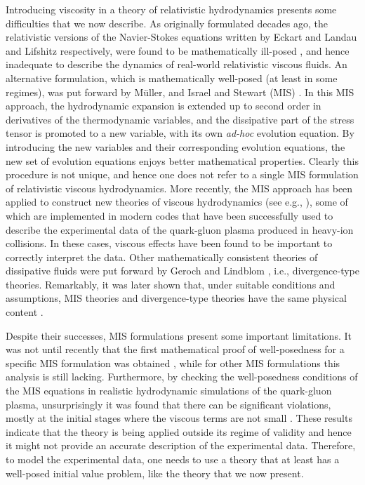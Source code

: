 \documentclass[prd,aps,twocolumn,floats,floatfix,nofootinbib,superscriptaddress] {revtex4-1}
\begin{document}
Introducing viscosity in a theory of relativistic hydrodynamics  presents some difficulties that we now describe. As originally formulated decades ago, the relativistic versions of the Navier-Stokes equations written by Eckart \cite{Eckart:1940te} and Landau and Lifshitz \cite{LandauBook} respectively, were found to be mathematically ill-posed \cite{Hiscock:1985zz}, and hence inadequate to describe the dynamics of real-world relativistic viscous fluids. 
%
An alternative formulation, which is mathematically well-posed (at least in some regimes),  was put forward by Müller, and Israel and Stewart  (MIS) \cite{Muller:1967zza,Israel:1976tn,Israel:1979wp}. In this MIS approach, the hydrodynamic expansion is extended up to second order in derivatives of the thermodynamic variables, and the dissipative part of the stress tensor is promoted to a new variable, with its own  \textit{ad-hoc} evolution equation. By introducing the new variables and their corresponding evolution equations, the new set of evolution equations enjoys better mathematical  properties. 
%
Clearly this procedure is not unique, and hence one does not refer to a single MIS formulation of relativistic viscous hydrodynamics.
%
More recently, the MIS approach has been applied to construct new theories of viscous hydrodynamics (see e.g., \cite{Baier:2007ix,Denicol:2012cn}), some of which are implemented in modern codes that have been successfully used to describe the experimental data of the quark-gluon plasma produced in heavy-ion collisions. In these cases, viscous effects have been found to be important to correctly interpret the data.
%
Other mathematically consistent theories of dissipative fluids were put forward by Geroch and Lindblom \cite{Geroch:1990bw}, i.e., divergence-type theories. Remarkably, it was later shown that, under suitable conditions and assumptions, MIS theories and divergence-type theories have the same physical content \cite{Geroch:1995bx,Lindblom:1995gp}.

Despite their successes, MIS formulations present some important limitations. It was not until recently that the first mathematical proof of well-posedness for a specific MIS formulation was obtained \cite{Bemfica:2020xym}, while for other MIS formulations this analysis is still lacking.
%
Furthermore, by checking the well-posedness conditions of the MIS equations in realistic hydrodynamic simulations of the quark-gluon plasma, unsurprisingly it was found that there can be significant violations, mostly at the initial stages where the viscous terms are not small \cite{Plumberg:2021bme,Chiu:2021muk,ExTrEMe:2023nhy,Domingues:2024pom}. These results indicate that the theory is being applied outside its regime of validity and hence it might not provide an accurate description of the experimental data. 
%
Therefore, to model the experimental data, one needs to use a theory that at least has a well-posed initial value problem,  like the theory that we now present.
\end{document}

